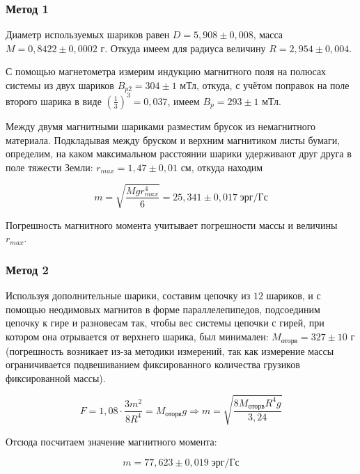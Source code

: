 \subsubsection{Метод 1}

Диаметр используемых шариков равен $D = 5,908 \pm 0,008$, масса $M = 0,8422 \pm 0,0002$ г. Откуда имеем для радиуса величину $R = 2,954 \pm 0,004$.

С помощью магнетометра измерим индукцию магнитного поля на полюсах системы из двух шариков $B_{p2} = 304 \pm 1$ мТл, откуда, с учётом поправок на поле второго шарика в виде $\left( \frac{1}{3} \right)^3 = 0,037$, имеем $B_{p} = 293 \pm 1$ мТл.

Между двумя магнитными шариками разместим брусок из немагнитного материала. Подкладывая между бруском и верхним магнитиком листы бумаги, определим, на каком максимальном расстоянии шарики удерживают друг друга в поле тяжести Земли: $r_{max} = 1,47 \pm 0,01$ см, откуда находим

\begin{equation}
    m = \sqrt{\frac{Mgr^4_{max}}{6}} = 25,341 \pm 0,017 \; \text{эрг}/\text{Гс}
\end{equation}

Погрешность магнитного момента учитывает погрешности массы и величины $r_{max}$. 

\subsubsection{Метод 2}

Используя дополнительные шарики, составим цепочку из $12$ шариков, и с помощью неодимовых магнитов в форме параллелепипедов, подсоединим цепочку к гире и разновесам так, чтобы вес системы цепочки с гирей, при котором она отрывается от верхнего шарика, был минимален: $M_{\text{оторв}} = 327 \pm 10$ г (погрешность возникает из-за методики измерений, так как измерение массы ограничивается подвешиванием фиксированного количества грузиков фиксированной массы).

\begin{equation}
    F = 1,08 \cdot \frac{3m^2}{8R^4} = M_{\text{оторв}} g \Rightarrow m = \sqrt{ \frac{8 M_{\text{оторв}} R^4 g}{3,24} }
\end{equation}

Отсюда посчитаем значение магнитного момента:

\begin{equation}
    m = 77,623 \pm 0,019 \; \text{эрг}/\text{Гс}
\end{equation}

